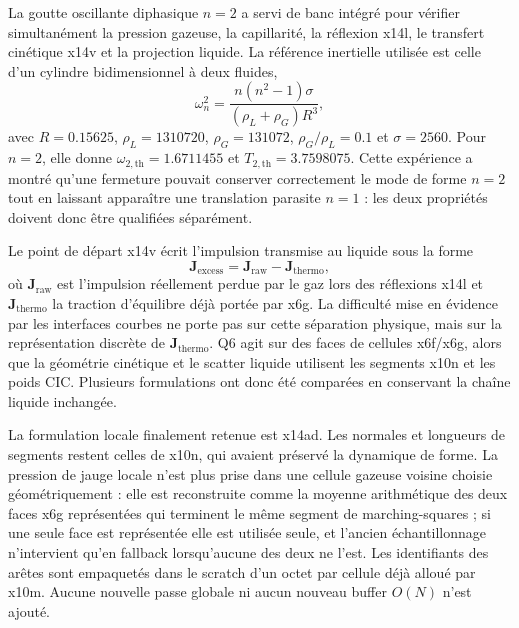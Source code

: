 \documentclass[11pt,a4paper]{article}
\begin{document}
La goutte oscillante diphasique $n=2$ a servi de banc intégré pour vérifier simultanément la pression gazeuse, la capillarité, la réflexion x14l, le transfert cinétique x14v et la projection liquide. La référence inertielle utilisée est celle d'un cylindre bidimensionnel à deux fluides,
\begin{equation}
  \omega_{n}^{2}=\frac{n(n^2-1)\sigma}{(\rho_L+\rho_G)R^3},
\end{equation}
avec $R=0.15625$, $\rho_L=1310720$, $\rho_G=131072$, $\rho_G/\rho_L=0.1$ et $\sigma=2560$. Pour $n=2$, elle donne $\omega_{2,\mathrm{th}}=1.6711455$ et $T_{2,\mathrm{th}}=3.7598075$. Cette expérience a montré qu'une fermeture pouvait conserver correctement le mode de forme $n=2$ tout en laissant apparaître une translation parasite $n=1$ : les deux propriétés doivent donc être qualifiées séparément.

Le point de départ x14v écrit l'impulsion transmise au liquide sous la forme
\begin{equation}
  \bm J_{\mathrm{excess}}=\bm J_{\mathrm{raw}}-\bm J_{\mathrm{thermo}},
\end{equation}
où $\bm J_{\mathrm{raw}}$ est l'impulsion réellement perdue par le gaz lors des réflexions x14l et $\bm J_{\mathrm{thermo}}$ la traction d'équilibre déjà portée par x6g. La difficulté mise en évidence par les interfaces courbes ne porte pas sur cette séparation physique, mais sur la représentation discrète de $\bm J_{\mathrm{thermo}}$. Q6 agit sur des faces de cellules x6f/x6g, alors que la géométrie cinétique et le scatter liquide utilisent les segments x10n et les poids CIC. Plusieurs formulations ont donc été comparées en conservant la chaîne liquide inchangée.

La formulation locale finalement retenue est x14ad. Les normales et longueurs de segments restent celles de x10n, qui avaient préservé la dynamique de forme. La pression de jauge locale n'est plus prise dans une cellule gazeuse voisine choisie géométriquement : elle est reconstruite comme la moyenne arithmétique des deux faces x6g représentées qui terminent le même segment de marching-squares ; si une seule face est représentée elle est utilisée seule, et l'ancien échantillonnage n'intervient qu'en fallback lorsqu'aucune des deux ne l'est. Les identifiants des arêtes sont empaquetés dans le scratch d'un octet par cellule déjà alloué par x10m. Aucune nouvelle passe globale ni aucun nouveau buffer $O(N)$ n'est ajouté.
\end{document}
